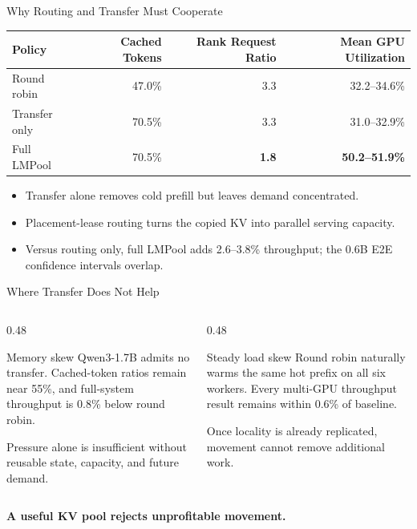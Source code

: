 \documentclass[aspectratio=169,10pt]{beamer}
\newcommand{\sys}{LMPool}
\newcommand{\good}[1]{\textcolor{LMGreen}{\bfseries #1}}
\newcommand{\caution}[1]{\textcolor{LMRed}{\bfseries #1}}
\begin{document}
\begin{frame}{Why Routing and Transfer Must Cooperate}
  \small
  \begin{center}
    \begin{tabular}{@{}lrrr@{}}
      \toprule
      Policy & Cached Tokens & Rank Request Ratio & Mean GPU Utilization \\
      \midrule
      Round robin & 47.0\% & 3.3 & 32.2--34.6\% \\
      Transfer only & 70.5\% & 3.3 & 31.0--32.9\% \\
      Full \sys{} & 70.5\% & \good{1.8} & \good{50.2--51.9\%} \\
      \bottomrule
    \end{tabular}
  \end{center}
  \vspace{0.7em}
  \begin{itemize}
    \item Transfer alone removes cold prefill but leaves demand concentrated.
    \item Placement-lease routing turns the copied KV into parallel serving capacity.
    \item Versus routing only, full \sys{} adds 2.6--3.8\% throughput; the 0.6B E2E confidence intervals overlap.
  \end{itemize}
\end{frame}

\begin{frame}{Where Transfer Does Not Help}
  \begin{columns}[T,onlytextwidth]
    \begin{column}{0.48\textwidth}
      \begin{block}{Memory skew}
        Qwen3-1.7B admits no transfer. Cached-token ratios remain near 55\%, and full-system throughput is 0.8\% below round robin.
      \end{block}
      \vspace{0.4em}
      \small Pressure alone is insufficient without reusable state, capacity, and future demand.
    \end{column}
    \begin{column}{0.48\textwidth}
      \begin{block}{Steady load skew}
        Round robin naturally warms the same hot prefix on all six workers. Every multi-GPU throughput result remains within 0.6\% of baseline.
      \end{block}
      \vspace{0.4em}
      \small Once locality is already replicated, movement cannot remove additional work.
    \end{column}
  \end{columns}
  \vspace{0.8em}
  \begin{center}
    \large\caution{A useful KV pool rejects unprofitable movement.}
  \end{center}
\end{frame}
\end{document}
